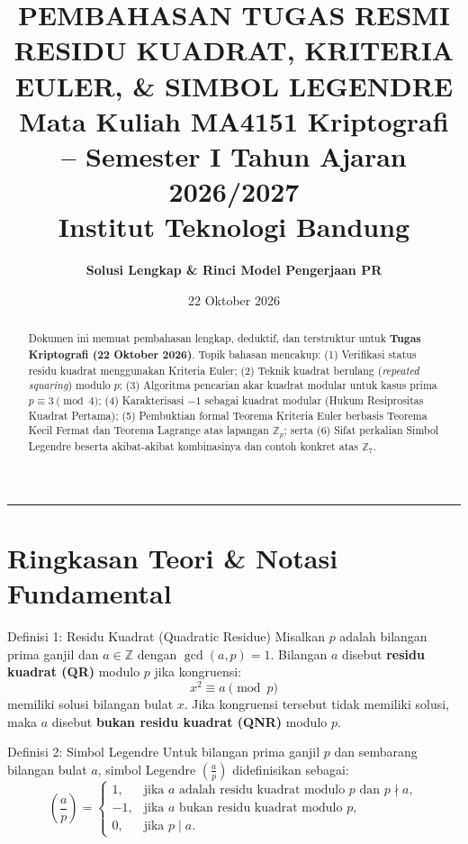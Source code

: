 \documentclass[11pt,a4paper]{article}
\title{
    \vspace{-1.2cm}
    \textbf{\huge PEMBAHASAN TUGAS RESMI}\\[0.2cm]
    \textbf{\Large RESIDU KUADRAT, KRITERIA EULER, \& SIMBOL LEGENDRE}\\[0.3cm]
    \large Mata Kuliah MA4151 Kriptografi -- Semester I Tahun Ajaran 2026/2027\\[0.1cm]
    \large Institut Teknologi Bandung
}
\author{\textbf{Solusi Lengkap \& Rinci Model Pengerjaan PR}}
\date{22 Oktober 2026}
\begin{document}
\maketitle
\vspace{-0.4cm}

\begin{abstract}
Dokumen ini memuat pembahasan lengkap, deduktif, dan terstruktur untuk \textbf{Tugas Kriptografi (22 Oktober 2026)}. Topik bahasan mencakup: (1) Verifikasi status residu kuadrat menggunakan Kriteria Euler; (2) Teknik kuadrat berulang (\textit{repeated squaring}) modulo $p$; (3) Algoritma pencarian akar kuadrat modular untuk kasus prima $p \equiv 3 \pmod 4$; (4) Karakterisasi $-1$ sebagai kuadrat modular (Hukum Resiprositas Kuadrat Pertama); (5) Pembuktian formal Teorema Kriteria Euler berbasis Teorema Kecil Fermat dan Teorema Lagrange atas lapangan $\mathbb{Z}_p$; serta (6) Sifat perkalian Simbol Legendre beserta akibat-akibat kombinasinya dan contoh konkret atas $\mathbb{Z}_7$.
\end{abstract}

\vspace{0.1cm}
\hrule
\vspace{0.2cm}

\tableofcontents
\newpage

\section{Ringkasan Teori \& Notasi Fundamental}

\begin{tipsbox}{Definisi 1: Residu Kuadrat (Quadratic Residue)}
Misalkan $p$ adalah bilangan prima ganjil dan $a \in \mathbb{Z}$ dengan $\gcd(a, p) = 1$. Bilangan $a$ disebut \textbf{residu kuadrat (QR)} modulo $p$ jika kongruensi:
\[
x^2 \equiv a \pmod p
\]
memiliki solusi bilangan bulat $x$. Jika kongruensi tersebut tidak memiliki solusi, maka $a$ disebut \textbf{bukan residu kuadrat (QNR)} modulo $p$.
\end{tipsbox}

\begin{tipsbox}{Definisi 2: Simbol Legendre}
Untuk bilangan prima ganjil $p$ dan sembarang bilangan bulat $a$, simbol Legendre $\left(\frac{a}{p}\right)$ didefinisikan sebagai:
\[
\left(\frac{a}{p}\right) = \begin{cases} 
1, & \text{jika } a \text{ adalah residu kuadrat modulo } p \text{ dan } p \nmid a, \\
-1, & \text{jika } a \text{ bukan residu kuadrat modulo } p, \\
0, & \text{jika } p \mid a.
\end{cases}
\]
\end{tipsbox}
\end{document}
